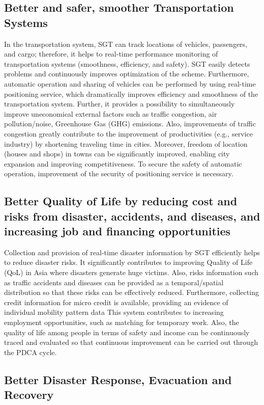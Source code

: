 \subsection{Better and safer, smoother Transportation Systems}

\tab In the transportation system, SGT can track locations of vehicles, passengers, and cargo; therefore, it helps to real-time performance monitoring of transportation systems (smoothness, efficiency, and safety). SGT easily detects problems and continuously improves optimization of the scheme. Furthermore, automatic operation and sharing of vehicles can be performed by using real-time positioning service, which dramatically improves efficiency and smoothness of the transportation system. Further, it provides a possibility to simultaneously improve uneconomical external factors such as traffic congestion, air pollution/noise, Greenhouse Gas (GHG) emissions. Also, improvements of traffic congestion greatly contribute to the improvement of productivities (e.g., service industry) by shortening traveling time in cities. Moreover, freedom of location (houses and shops) in towns can be significantly improved, enabling city expansion and improving competitiveness. To secure the safety of automatic operation, improvement of the security of positioning service is necessary.

\subsection{Better Quality of Life by reducing cost and risks from disaster, accidents, and diseases, and increasing job and financing opportunities}

\tab Collection and provision of real-time disaster information by SGT efficiently helps to reduce disaster risks. It significantly contributes to improving Quality of Life (QoL) in Asia where disasters generate huge victims. Also, risks information such as traffic accidents and diseases can be provided as a temporal/spatial distribution so that these risks can be effectively reduced. Furthermore, collecting credit information for micro credit is available, providing an evidence of individual mobility pattern data This system contributes to increasing employment opportunities, such as matching for temporary work. Also, the quality of life among people in terms of safety and income can be continuously traced and evaluated so that continuous improvement can be carried out through the PDCA cycle.

\subsection{Better Disaster Response, Evacuation and Recovery}

